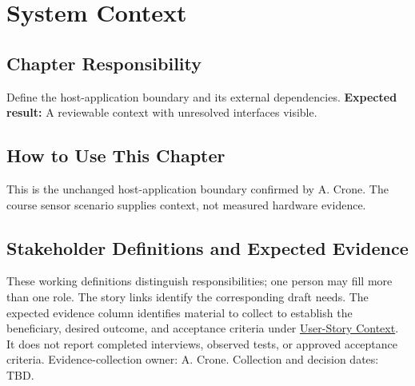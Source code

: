 \chapter{System Context}
\section{Chapter Responsibility}
\label{Section:SystemContextResponsibility}
Define the host-application boundary and its external dependencies.
\noindent\textbf{Expected result:} A reviewable context with unresolved interfaces visible.

\section{How to Use This Chapter}
This is the unchanged host-application boundary confirmed by A. Crone.
The course sensor scenario supplies context, not measured hardware evidence.
\section{Stakeholder Definitions and Expected Evidence}
\label{Section:StakeholderDefinitions}
These working definitions distinguish responsibilities; one person may fill
more than one role. The story links identify the corresponding draft needs.
The expected evidence column identifies material to collect to establish the
beneficiary, desired outcome, and acceptance criteria under
\hyperref[Section:AIUserStoryContext]{User-Story Context}. It does not report
completed interviews, observed tests, or approved acceptance criteria.
Evidence-collection owner: A. Crone. Collection and decision dates: TBD.

